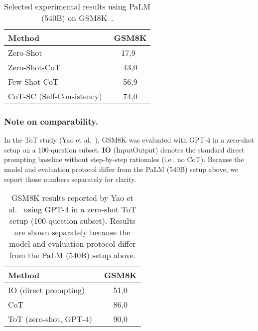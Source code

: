 \begin{table}[h!]
    \centering
    \begin{tabular}{|l|c|}
        \hline
        Method & GSM8K\\
        \hline
    Zero-Shot & 17,9~\cite{chainofthought} \\
        Zero-Shot-CoT~\cite{chainofzero} & 43,0 \\
        Few-Shot-CoT~\cite{chainofthought} & 56,9 \\
        CoT-SC (Self-Consistency)~\cite{chainofthought} & 74,0 \\
        \hline
    \end{tabular}
    \caption{Selected experimental results using PaLM (540B) on GSM8K~\cite{chainofthought}.}
    \label{tab:chainofzero}
\end{table}

\subsubsection{Note on comparability.} In the ToT study (Yao et al.~\cite{treeofthought}), GSM8K was evaluated with \gls{GPT}-4 in a zero-shot setup on a 100-question subset. \textbf{IO} (Input\textendash Output) denotes the standard direct prompting baseline without step-by-step rationales (i.e., no CoT). Because the model and evaluation protocol differ from the PaLM (540B) setup above, we report those numbers separately for clarity.

\begin{table}[h!]
    \centering
    \begin{tabular}{|l|c|}
        \hline
        Method & GSM8K\\
        \hline
        IO (direct prompting)~\cite{treeofthought} & 51,0 \\
        CoT~\cite{treeofthought} & 86,0 \\
        ToT (zero-shot, GPT-4)~\cite{treeofthought} & 90,0 \\
        \hline
    \end{tabular}
    \caption{GSM8K results reported by Yao et al.~\cite{treeofthought} using GPT-4 in a zero-shot ToT setup (100-question subset). Results are shown separately because the model and evaluation protocol differ from the PaLM (540B) setup above.}
    \label{tab:tot-gpt4-gsm8k}
\end{table}

